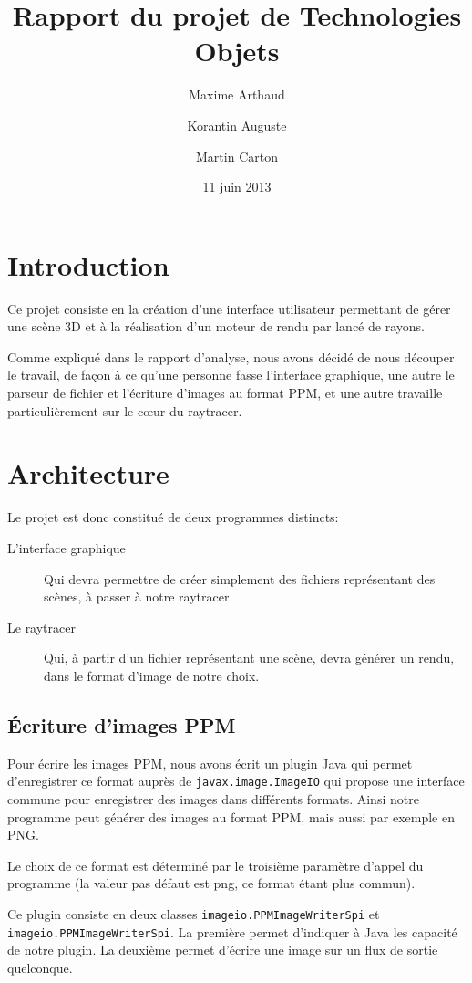 \documentclass[a4paper]{article}
\title{Rapport du projet de Technologies Objets}
\author{Maxime Arthaud \and Korantin Auguste \and Martin Carton}
\date{11 juin 2013}
\begin{document}
\maketitle 
\tableofcontents
\listoffigures
\newpage

\section{Introduction}
  Ce projet consiste en la création d'une interface utilisateur permettant de
  gérer une scène 3D et à la réalisation d'un moteur de rendu par lancé de
  rayons.

  Comme expliqué dans le rapport d'analyse, nous avons décidé de nous découper
  le travail, de façon à ce qu'une personne fasse l'interface graphique,
  une autre le parseur de fichier et l'écriture d'images au format PPM, et une
  autre travaille particulièrement sur le cœur du raytracer.

\section{Architecture}
  Le projet est donc constitué de deux programmes distincts:
  \begin{description}
      \item[L'interface graphique] Qui devra permettre de créer simplement des
        fichiers représentant des scènes, à passer à notre raytracer.
      \item[Le raytracer] Qui, à partir d'un fichier représentant une scène,
        devra générer un rendu, dans le format d'image de notre choix.
  \end{description}

  \subsection{Écriture d'images PPM}
    Pour écrire les images PPM, nous avons écrit un plugin Java qui permet
    d'enregistrer ce format auprès de \verb+javax.image.ImageIO+ qui propose une
    interface commune pour enregistrer des images dans différents formats. Ainsi
    notre programme peut générer des images au format PPM, mais aussi par
    exemple en PNG.
    
    Le choix de ce format est déterminé par le troisième paramètre d'appel du
    programme (la valeur pas défaut est png, ce format étant plus commun).

    Ce plugin consiste en deux classes \verb+imageio.PPMImageWriterSpi+ et
    \verb+imageio.PPMImageWriterSpi+. La première permet d'indiquer à Java les
    capacité de notre plugin. La deuxième permet d'écrire une image sur un flux
    de sortie quelconque.
\end{document}
